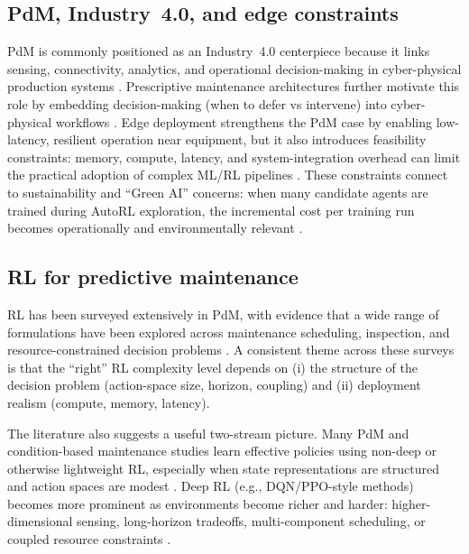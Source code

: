 \documentclass[11pt]{article}
\begin{document}
\subsection{PdM, Industry~4.0, and edge constraints}
PdM is commonly positioned as an Industry~4.0 centerpiece because it links sensing, connectivity, analytics, and operational decision-making in cyber-physical production systems \parencite{Compare2020IoT, Zonta2020PdM}. Prescriptive maintenance architectures further motivate this role by embedding decision-making (when to defer vs intervene) into cyber-physical workflows \parencite{Ansari2019PriMa}. Edge deployment strengthens the PdM case by enabling low-latency, resilient operation near equipment, but it also introduces feasibility constraints: memory, compute, latency, and system-integration overhead can limit the practical adoption of complex ML/RL pipelines \parencite{Njor2024TinyML, Pandey2023EdgeDNN}. These constraints connect to sustainability and ``Green AI'' concerns: when many candidate agents are trained during AutoRL exploration, the incremental cost per training run becomes operationally and environmentally relevant \parencite{Schwartz2020GreenAI, Strubell2019Energy}.

\subsection{RL for predictive maintenance}
RL has been surveyed extensively in PdM, with evidence that a wide range of formulations have been explored across maintenance scheduling, inspection, and resource-constrained decision problems \parencite{Siraskar2023RLReview, Ogunfowora2023, Zhang2024}. A consistent theme across these surveys is that the ``right'' RL complexity level depends on (i) the structure of the decision problem (action-space size, horizon, coupling) and (ii) deployment realism (compute, memory, latency).

The literature also suggests a useful two-stream picture. Many PdM and condition-based maintenance studies learn effective policies using non-deep or otherwise lightweight RL, especially when state representations are structured and action spaces are modest \parencite{Adsule2020CBMRL, Yousefi2020QualityEngineering, Rasay2024JointOptimization, Dadash2024Lifespan}. Deep RL (e.g., DQN/PPO-style methods) becomes more prominent as environments become richer and harder: higher-dimensional sensing, long-horizon tradeoffs, multi-component scheduling, or coupled resource constraints \parencite{Liu2020EJOR, Chen2023IISE, LeeMitici2022RESS, Ong2022TransferDRL}.
\end{document}
